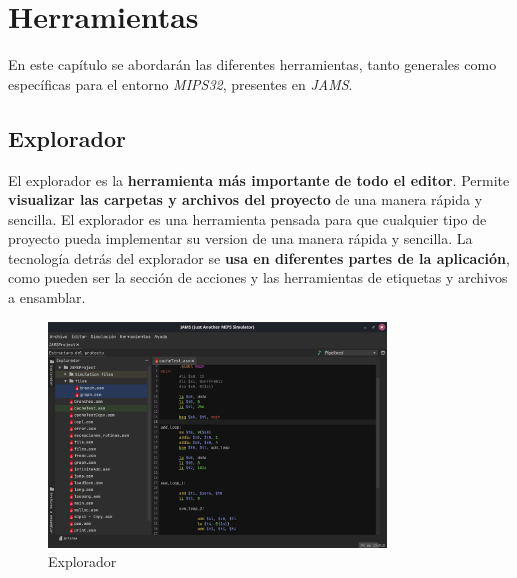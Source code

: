 \chapter{Herramientas}\label{ch:herramientas}

En este capítulo se abordarán las diferentes herramientas,
tanto generales como específicas para el entorno \textit{MIPS32},
presentes en \textit{JAMS}.


\section{Explorador}\label{sec:explorador}

El explorador es la \textbf{herramienta más importante de todo el editor}.
Permite \textbf{visualizar las carpetas y archivos del proyecto}
de una manera rápida y sencilla.
El explorador es una herramienta pensada para que cualquier tipo de proyecto
pueda implementar su version de una manera rápida y sencilla.
La tecnología detrás del explorador se \textbf{usa en diferentes partes de la aplicación},
como pueden ser la sección de acciones y las herramientas de etiquetas y archivos
a ensamblar.

\begin{figure}[H]
    \centering
    \includegraphics[width=0.8\textwidth]{images/tools/jams-explorer}
    \caption{Explorador}
    \label{fig:jams-explorer}
\end{figure}

